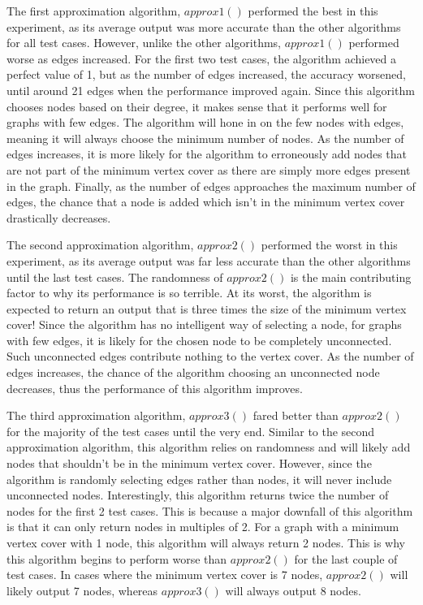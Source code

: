 \documentclass[titlepage]{article}
\begin{document}
The first approximation algorithm, $approx1()$ performed the best in this experiment, as its average output was more accurate than the other algorithms for all test cases. However, unlike the other algorithms, $approx1()$ performed worse as edges increased. For the first two test cases, the algorithm achieved a perfect value of 1, but as the number of edges increased, the accuracy worsened, until around 21 edges when the performance improved again. Since this algorithm chooses nodes based on their degree, it makes sense that it performs well for graphs with few edges. The algorithm will hone in on the few nodes with edges, meaning it will always choose the minimum number of nodes. As the number of edges increases, it is more likely for the algorithm to erroneously add nodes that are not part of the minimum vertex cover as there are simply more edges present in the graph. Finally, as the number of edges approaches the maximum number of edges, the chance that a node is added which isn't in the minimum vertex cover drastically decreases.

The second approximation algorithm, $approx2()$ performed the worst in this experiment, as its average output was far less accurate than the other algorithms until the last test cases.
The randomness of $approx2()$ is the main contributing factor to why its performance is so terrible. At its worst, the algorithm is expected to return an output that is three times the size of the minimum vertex cover! Since the algorithm has no intelligent way of selecting a node, for graphs with few edges, it is likely for the chosen node to be completely unconnected. Such unconnected edges contribute nothing to the vertex cover. As the number of edges increases, the chance of the algorithm choosing an unconnected node decreases, thus the performance of this algorithm improves.

The third approximation algorithm, $approx3()$ fared better than $approx2()$ for the majority of the test cases until the very end. Similar to the second approximation algorithm, this algorithm relies on randomness and will likely add nodes that shouldn't be in the minimum vertex cover. However, since the algorithm is randomly selecting edges rather than nodes, it will never include unconnected nodes. Interestingly, this algorithm returns twice the number of nodes for the first 2 test cases. This is because a major downfall of this algorithm is that it can only return nodes in multiples of 2. For a graph with a minimum vertex cover with 1 node, this algorithm will always return 2 nodes. This is why this algorithm begins to perform worse than $approx2()$ for the last couple of test cases. In cases where the minimum vertex cover is 7 nodes, $approx2()$ will likely output 7 nodes, whereas $approx3()$ will always output 8 nodes.
\end{document}
